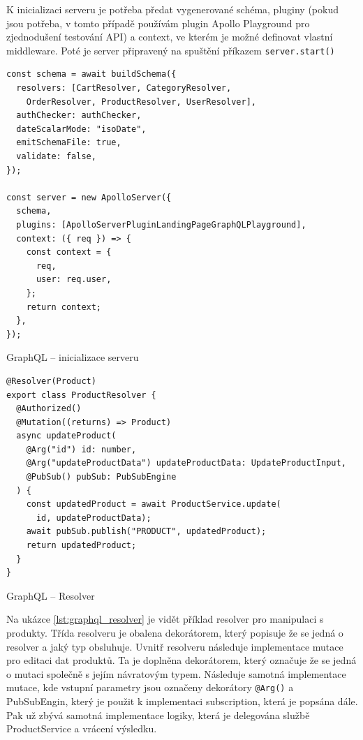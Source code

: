 \documentclass[thesis=M,czech]{FITthesis}[2019/12/23]
\begin{document}
K inicializaci serveru je potřeba předat vygenerované schéma, pluginy (pokud jsou potřeba, v tomto případě používám plugin Apollo Playground pro zjednodušení testování API) a context, ve kterém je možné definovat vlastní middleware. Poté je server připravený na spuštění příkazem \texttt{server.start()}

\begin{listing}
\begin{verbatim}
const schema = await buildSchema({
  resolvers: [CartResolver, CategoryResolver,
    OrderResolver, ProductResolver, UserResolver],
  authChecker: authChecker,
  dateScalarMode: "isoDate",
  emitSchemaFile: true,
  validate: false,
});

const server = new ApolloServer({
  schema,
  plugins: [ApolloServerPluginLandingPageGraphQLPlayground],
  context: ({ req }) => {
    const context = {
      req,
      user: req.user,
    };
    return context;
  },
});
\end{verbatim}
\caption{GraphQL -- inicializace serveru}
\label{lst:example}
\end{listing}

\begin{listing}[H]
\begin{verbatim}
@Resolver(Product)
export class ProductResolver {
  @Authorized()
  @Mutation((returns) => Product)
  async updateProduct(
    @Arg("id") id: number,
    @Arg("updateProductData") updateProductData: UpdateProductInput,
    @PubSub() pubSub: PubSubEngine
  ) {
    const updatedProduct = await ProductService.update(
      id, updateProductData);
    await pubSub.publish("PRODUCT", updatedProduct);
    return updatedProduct;
  }
}
\end{verbatim}
\caption{GraphQL -- Resolver}
\label{lst:graphql_resolver}
\end{listing}

Na ukázce \ref{lst:graphql_resolver} je vidět příklad resolver pro manipulaci s produkty. Třída resolveru je obalena dekorátorem, který popisuje že se jedná o resolver a jaký typ obsluhuje. Uvnitř resolveru následuje implementace mutace pro editaci dat produktů. Ta je doplněna dekorátorem, který označuje že se jedná o mutaci společně s jejím návratovým typem. Následuje samotná implementace mutace, kde vstupní parametry jsou označeny dekorátory \texttt{@Arg()} a PubSubEngin, který je použit k implementaci subscription, která je popsána dále. Pak už zbývá samotná implementace logiky, která je delegována službě ProductService a vrácení výsledku.
\end{document}
